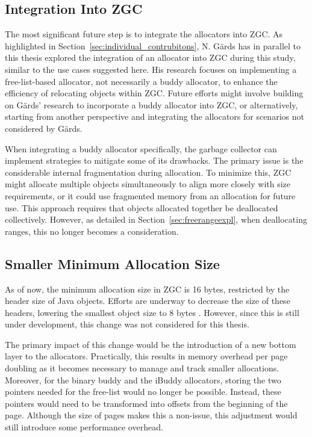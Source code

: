 \subsection{Integration Into ZGC} \label{sec:futureworkZ}
The most significant future step is to integrate the allocators into ZGC. As highlighted in Section~\ref{sec:individual_contrubitons}, N. Gärds has in parallel to this thesis explored the integration of an allocator into ZGC during this study, similar to the use cases suggested here. His research focuses on implementing a free-list-based allocator, not necessarily a buddy allocator, to enhance the efficiency of relocating objects within ZGC. Future efforts might involve building on Gärds' research to incorporate a buddy allocator into ZGC, or alternatively, starting from another perspective and integrating the allocators for scenarios not considered by Gärds.

When integrating a buddy allocator specifically, the garbage collector can implement strategies to mitigate some of its drawbacks. The primary issue is the considerable internal fragmentation during allocation. To minimize this, ZGC might allocate multiple objects simultaneously to align more closely with size requirements, or it could use fragmented memory from an allocation for future use. This approach requires that objects allocated together be deallocated collectively. However, as detailed in Section~\ref{sec:freerangeexpl}, when deallocating ranges, this no longer becomes a consideration.

\subsection{Smaller Minimum Allocation Size}
As of now, the minimum allocation size in ZGC is 16 bytes, restricted by the header size of Java objects. Efforts are underway to decrease the size of these headers, lowering the smallest object size to 8 bytes \cite{liliput}. However, since this is still under development, this change was not considered for this thesis.

The primary impact of this change would be the introduction of a new bottom layer to the allocators. Practically, this results in memory overhead per page doubling as it becomes necessary to manage and track smaller allocations. Moreover, for the binary buddy and the iBuddy allocators, storing the two pointers needed for the free-list would no longer be possible. Instead, these pointers would need to be transformed into offsets from the beginning of the page. Although the size of pages makes this a non-issue, this adjustment would still introduce some performance overhead.

